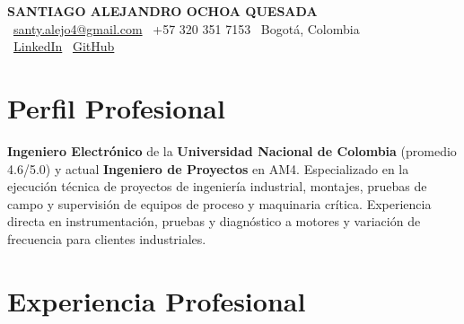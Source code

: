 \documentclass[11pt,a4paper]{article}
\begin{document}
\thispagestyle{empty}
\color{darktext}

\begin{center}
    {\Huge \bfseries\color{accent} SANTIAGO ALEJANDRO OCHOA QUESADA} \\[6pt]
    {\small\color{darktext}
    \faEnvelope\ \href{mailto:santy.alejo4@gmail.com}{santy.alejo4@gmail.com}
    \quad\textcolor{bulletline}{\textbar}\quad
    \faPhone\ +57 320 351 7153
    \quad\textcolor{bulletline}{\textbar}\quad
    \faMapMarker*\ Bogotá, Colombia \\[4pt]
    \faLinkedin\ \href{https://linkedin.com/in/santiago-alejandro-ochoa-quesada-a07a18288/}{LinkedIn}
    \quad\textcolor{bulletline}{\textbar}\quad
    \faGithub\ \href{https://github.com/Sochoaq}{GitHub}
    }
\end{center}
\vspace{4pt}

\section{Perfil Profesional}
\textbf{\textbf{\textbf{\textbf{Ingeniero Electrónico}}}} de la \textbf{\textbf{\textbf{\textbf{Universidad Nacional de Colombia}}}} (promedio 4.6/5.0) y actual \textbf{\textbf{\textbf{\textbf{Ingeniero de Proyectos}}}} en AM4. Especializado en la ejecución técnica de proyectos de ingeniería industrial, montajes, pruebas de campo y supervisión de equipos de proceso y maquinaria crítica. Experiencia directa en instrumentación, pruebas y diagnóstico a motores y variación de frecuencia para clientes industriales.

\section{Experiencia Profesional}
\end{document}
